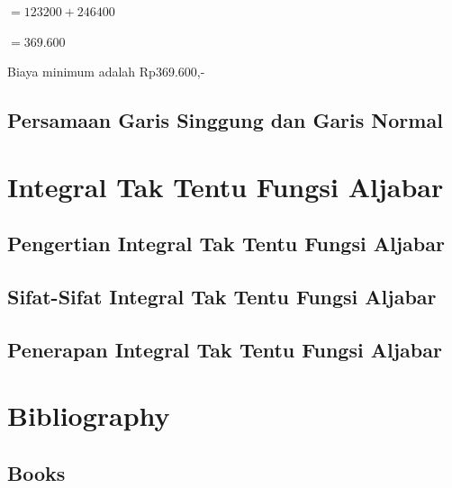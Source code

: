 \documentclass[11pt,fleqn]{book} %
\begin{document}
$= 123200 + 246400$

$= 369.600$

Biaya minimum adalah Rp369.600,-
\section{Persamaan Garis Singgung dan Garis Normal}


\chapter{Integral Tak Tentu Fungsi Aljabar}

\section{Pengertian Integral Tak Tentu Fungsi Aljabar}

\section{Sifat-Sifat Integral Tak Tentu Fungsi Aljabar}

\section{Penerapan Integral Tak Tentu Fungsi Aljabar}




\chapter*{Bibliography}
\section*{Books}
\printbibliography[heading=bibempty,type=book]
\end{document}

